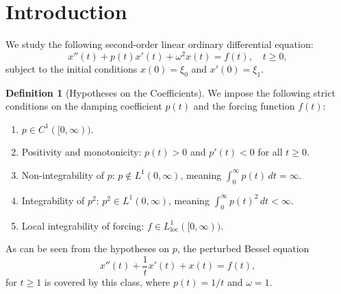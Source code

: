 \documentclass[10pt,reqno]{amsart}
\theoremstyle{definition}
\newtheorem{definition}[theorem]{Definition}
\begin{document}
	\section{Introduction}	
	We study the following second-order linear ordinary differential equation:
	\begin{equation} \label{eq:original}
		x''(t) + p(t)x'(t) + \omega^2 x(t) = f(t), \quad t \ge 0,
	\end{equation}
	subject to the initial conditions $x(0) = \xi_0$ and $x'(0) = \xi_1$.
	\begin{definition}[Hypotheses on the Coefficients]
		We impose the following strict conditions on the damping coefficient $p(t)$ and the forcing function $f(t)$:
		\begin{enumerate}
			\item $p \in C^1([0, \infty))$.
			\item Positivity and monotonicity: $p(t) > 0$ and $p'(t) < 0$ for all $t \ge 0$.
			\item Non-integrability of $p$: $p \notin L^1(0, \infty)$, meaning $\int_0^\infty p(t) \, dt = \infty$.
			\item Integrability of $p^2$: $p^2 \in L^1(0, \infty)$, meaning $\int_0^\infty p(t)^2 \, dt < \infty$.
			\item Local integrability of forcing: $f \in L^1_{\text{loc}}([0, \infty))$.
		\end{enumerate}
	\end{definition}
	As can be seen from the hypotheses on $p$, the perturbed Bessel equation 
	\[
	x''(t)+\frac{1}{t}x'(t)+x(t)=f(t),
	\]
	for $t\geq 1$ is covered by this class, where $p(t)=1/t$ and $\omega=1$. 
	
\end{document}
